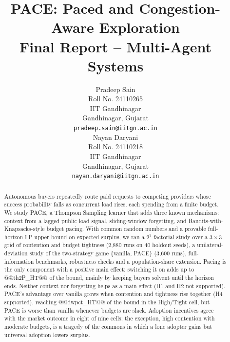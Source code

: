 \documentclass{article}
\title{PACE: Paced and Congestion-Aware Exploration\\
\Large Final Report -- Multi-Agent Systems}
\author{
  Pradeep Sain \\
  Roll No. 24110265 \\
  IIT Gandhinagar\\
  Gandhinagar, Gujarat \\
  \texttt{pradeep.sain@iitgn.ac.in} \\
  \And
  Nayan Daryani \\
  Roll No. 24110218 \\
  IIT Gandhinagar \\
  Gandhinagar, Gujarat \\
  \texttt{nayan.daryani@iitgn.ac.in} \\
}
\begin{document}
\maketitle

\begin{abstract}
Autonomous buyers repeatedly route paid requests to competing providers whose success probability falls as concurrent load rises, each spending from a finite budget. We study PACE, a Thompson Sampling learner that adds three known mechanisms: context from a lagged public load signal, sliding-window forgetting, and Bandits-with-Knapsacks-style budget pacing. With common random numbers and a provable full-horizon LP upper bound on expected surplus, we ran a $2^3$ factorial study over a $3\times3$ grid of contention and budget tightness (2,880 runs on 40 holdout seeds), a unilateral-deviation study of the two-strategy game \{vanilla, PACE\} (3,600 runs), full-information benchmarks, robustness checks and a population-share extension. Pacing is the only component with a positive main effect: switching it on adds up to @@th2P_HT@@ of the bound, mainly by keeping buyers solvent until the horizon ends. Neither context nor forgetting helps as a main effect (H1 and H2 not supported). PACE's advantage over vanilla grows when contention and tightness rise together (H4 supported), reaching @@dwpct_HT@@ of the bound in the High/Tight cell, but PACE is worse than vanilla whenever budgets are slack. Adoption incentives agree with the market outcome in eight of nine cells; the exception, high contention with moderate budgets, is a tragedy of the commons in which a lone adopter gains but universal adoption lowers surplus.
\end{abstract}


\vspace{4pt}
\noindent{}
\end{document}

